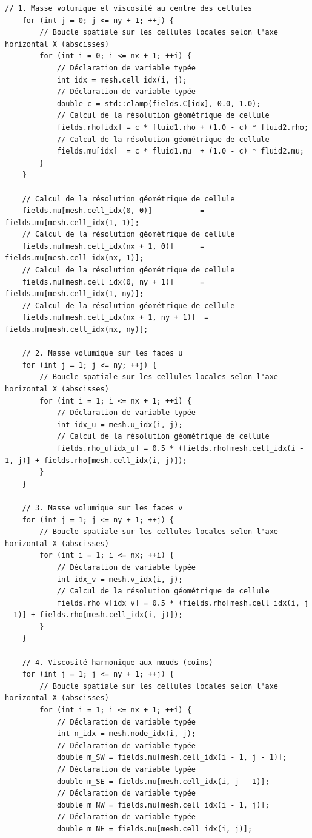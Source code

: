 \documentclass[10pt,a4paper,oneside]{book}
\begin{document}
\begin{lstlisting}[language={[11]C++}]
    // 1. Masse volumique et viscosité au centre des cellules
    for (int j = 0; j <= ny + 1; ++j) {
        // Boucle spatiale sur les cellules locales selon l'axe horizontal X (abscisses)
        for (int i = 0; i <= nx + 1; ++i) {
            // Déclaration de variable typée
            int idx = mesh.cell_idx(i, j);
            // Déclaration de variable typée
            double c = std::clamp(fields.C[idx], 0.0, 1.0);
            // Calcul de la résolution géométrique de cellule
            fields.rho[idx] = c * fluid1.rho + (1.0 - c) * fluid2.rho;
            // Calcul de la résolution géométrique de cellule
            fields.mu[idx]  = c * fluid1.mu  + (1.0 - c) * fluid2.mu;
        }
    }

    // Calcul de la résolution géométrique de cellule
    fields.mu[mesh.cell_idx(0, 0)]           = fields.mu[mesh.cell_idx(1, 1)];
    // Calcul de la résolution géométrique de cellule
    fields.mu[mesh.cell_idx(nx + 1, 0)]      = fields.mu[mesh.cell_idx(nx, 1)];
    // Calcul de la résolution géométrique de cellule
    fields.mu[mesh.cell_idx(0, ny + 1)]      = fields.mu[mesh.cell_idx(1, ny)];
    // Calcul de la résolution géométrique de cellule
    fields.mu[mesh.cell_idx(nx + 1, ny + 1)]  = fields.mu[mesh.cell_idx(nx, ny)];

    // 2. Masse volumique sur les faces u
    for (int j = 1; j <= ny; ++j) {
        // Boucle spatiale sur les cellules locales selon l'axe horizontal X (abscisses)
        for (int i = 1; i <= nx + 1; ++i) {
            // Déclaration de variable typée
            int idx_u = mesh.u_idx(i, j);
            // Calcul de la résolution géométrique de cellule
            fields.rho_u[idx_u] = 0.5 * (fields.rho[mesh.cell_idx(i - 1, j)] + fields.rho[mesh.cell_idx(i, j)]);
        }
    }

    // 3. Masse volumique sur les faces v
    for (int j = 1; j <= ny + 1; ++j) {
        // Boucle spatiale sur les cellules locales selon l'axe horizontal X (abscisses)
        for (int i = 1; i <= nx; ++i) {
            // Déclaration de variable typée
            int idx_v = mesh.v_idx(i, j);
            // Calcul de la résolution géométrique de cellule
            fields.rho_v[idx_v] = 0.5 * (fields.rho[mesh.cell_idx(i, j - 1)] + fields.rho[mesh.cell_idx(i, j)]);
        }
    }

    // 4. Viscosité harmonique aux nœuds (coins)
    for (int j = 1; j <= ny + 1; ++j) {
        // Boucle spatiale sur les cellules locales selon l'axe horizontal X (abscisses)
        for (int i = 1; i <= nx + 1; ++i) {
            // Déclaration de variable typée
            int n_idx = mesh.node_idx(i, j);
            // Déclaration de variable typée
            double m_SW = fields.mu[mesh.cell_idx(i - 1, j - 1)];
            // Déclaration de variable typée
            double m_SE = fields.mu[mesh.cell_idx(i, j - 1)];
            // Déclaration de variable typée
            double m_NW = fields.mu[mesh.cell_idx(i - 1, j)];
            // Déclaration de variable typée
            double m_NE = fields.mu[mesh.cell_idx(i, j)];


\end{lstlisting}
\end{document}

